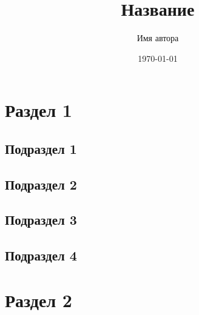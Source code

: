 \documentclass[a4paper,12pt]{article} %
\author{Имя автора}
\title{Название}
\date{\today}
\begin{document}
\maketitle
\newpage
\section{Раздел 1}

\subsection{Подраздел 1}

\subsection{Подраздел 2}

\subsection{Подраздел 3}

\subsection{Подраздел 4}

\section{Раздел 2}
\end{document}
